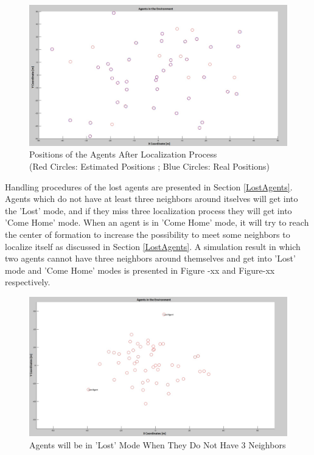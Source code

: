 \begin{figure}[H]
\centering
\captionsetup{format=hang,justification=centerfirst}
\caption{Positions of the Agents After Localization Process \\
(Red Circles: Estimated Positions ; Blue Circles: Real Positions)} \label{duzgun_pos_ref}
\centerline{\includegraphics[scale = 0.27]{Pozisyon-1-Duzeltilmis}}
\end{figure} 
		
Handling procedures of the lost agents are presented in Section \ref{LostAgents}. Agents which do not have at least three neighbors around itselves will get into the 'Lost' mode, and if  they miss three localization process they will get into 'Come Home' mode. When an agent is in 'Come Home' mode, it will try to reach the center of formation to increase the possibility to meet some neighbors to localize itself as discussed in Section \ref{LostAgents}. A simulation result in which two agents cannot have three neighbors around themselves and get into 'Lost' mode and 'Come Home' modes  is presented in Figure -xx and Figure-xx respectively.
		
\begin{figure}[H]
\caption{Agents will be in 'Lost' Mode When They Do Not Have 3 Neighbors}
\centering
\centerline{\includegraphics[scale = 0.27]{Lost-2-2}}
\end{figure} 

